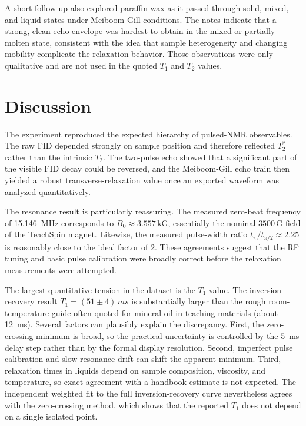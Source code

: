 \documentclass[11pt]{article}
\begin{document}
A short follow-up also explored paraffin wax as it passed through solid, mixed, and liquid states under Meiboom-Gill conditions. The notes indicate that a strong, clean echo envelope was hardest to obtain in the mixed or partially molten state, consistent with the idea that sample heterogeneity and changing mobility complicate the relaxation behavior. Those observations were only qualitative and are not used in the quoted $T_1$ and $T_2$ values.

\section{Discussion}

The experiment reproduced the expected hierarchy of pulsed-NMR observables. The raw FID depended strongly on sample position and therefore reflected $T_2^\ast$ rather than the intrinsic $T_2$. The two-pulse echo showed that a significant part of the visible FID decay could be reversed, and the Meiboom-Gill echo train then yielded a robust transverse-relaxation value once an exported waveform was analyzed quantitatively.

The resonance result is particularly reassuring. The measured zero-beat frequency of \SI{15.146}{MHz} corresponds to $B_0 \approx 3.557\,\mathrm{kG}$, essentially the nominal $3500\,\mathrm{G}$ field of the TeachSpin magnet.\cite{teachspin} Likewise, the measured pulse-width ratio $t_\pi/t_{\pi/2} \approx 2.25$ is reasonably close to the ideal factor of 2. These agreements suggest that the RF tuning and basic pulse calibration were broadly correct before the relaxation measurements were attempted.

The largest quantitative tension in the dataset is the $T_1$ value. The inversion-recovery result $T_1 = (51 \pm 4)\,\si{ms}$ is substantially larger than the rough room-temperature guide often quoted for mineral oil in teaching materials (about \SI{12}{ms}).\cite{teachspin} Several factors can plausibly explain the discrepancy. First, the zero-crossing minimum is broad, so the practical uncertainty is controlled by the \SI{5}{ms} delay step rather than by the formal display resolution. Second, imperfect pulse calibration and slow resonance drift can shift the apparent minimum. Third, relaxation times in liquids depend on sample composition, viscosity, and temperature, so exact agreement with a handbook estimate is not expected.\cite{uwmanual} The independent weighted fit to the full inversion-recovery curve nevertheless agrees with the zero-crossing method, which shows that the reported $T_1$ does not depend on a single isolated point.
\end{document}

